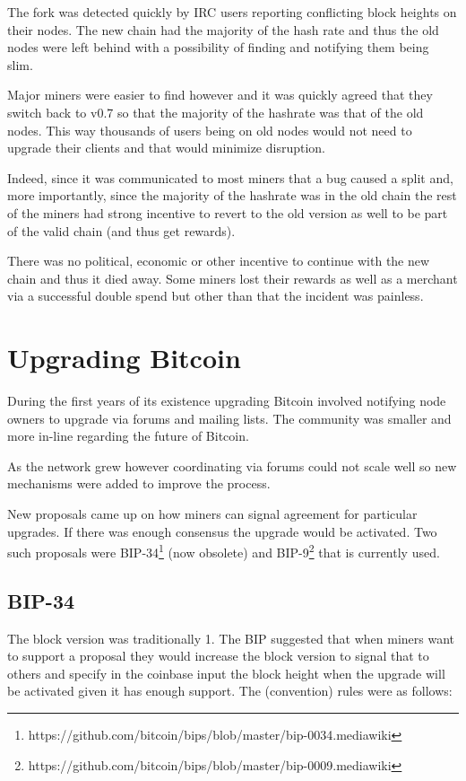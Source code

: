 The fork was detected quickly by IRC users reporting conflicting block heights on their nodes. The new chain had the majority of the hash rate and thus the old nodes were left behind with a possibility of finding and notifying them being slim.

Major miners were easier to find however and it was quickly agreed that they switch back to v0.7 so that the majority of the hashrate was that of the old nodes. This way thousands of users being on old nodes would not need to upgrade their clients and that would minimize disruption. 

Indeed, since it was communicated to most miners that a bug caused a split and, more importantly, since the majority of the hashrate was in the old chain the rest of the miners had strong incentive to revert to the old version as well to be part of the valid chain (and thus get rewards).

There was no political, economic or other incentive to continue with the new chain and thus it died away. Some miners lost their rewards as well as a merchant via a successful double spend but other than that the incident was painless.

\section{Upgrading Bitcoin}
During the first years of its existence upgrading Bitcoin involved notifying node owners to upgrade via forums and mailing lists. The community was smaller and more in-line regarding the future of Bitcoin.

As the network grew however coordinating via forums could not scale well so new mechanisms were added to improve the process.

New proposals came up on how miners can signal agreement for particular upgrades. If there was enough consensus the upgrade would be activated. Two such proposals were BIP-34\footnote{https://github.com/bitcoin/bips/blob/master/bip-0034.mediawiki} (now obsolete) and BIP-9\footnote{https://github.com/bitcoin/bips/blob/master/bip-0009.mediawiki} that is currently used.

\subsection*{BIP-34}
The block version was traditionally 1. The BIP suggested that when miners want to support a proposal they would increase the block version to signal that to others and specify in the coinbase input the block height when the upgrade will be activated given it has enough support. The (convention) rules were as follows:


